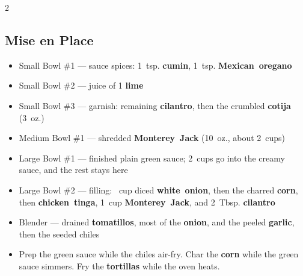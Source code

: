 \documentclass[11pt,letterpaper]{article}
\begin{document}
{\begin{multicols}{2}
\subsection*{Mise en Place}
\begin{itemize}
    \item Small Bowl \#1 --- sauce spices: 1~tsp. \textbf{cumin}, 1~tsp. \textbf{Mexican~oregano}
    \item Small Bowl \#2 --- juice of 1 \textbf{lime}
    \item Small Bowl \#3 --- garnish: remaining \textbf{cilantro}, then the crumbled \textbf{cotija} (3~oz.)
    \item Medium Bowl \#1 --- shredded \textbf{Monterey~Jack} (10~oz., about 2~cups)
    \item Large Bowl \#1 --- finished plain green sauce; 2~cups go into the creamy sauce, and the rest stays here
    \item Large Bowl \#2 --- filling: ~cup diced \textbf{white~onion}, then the charred \textbf{corn}, then \textbf{chicken~tinga}, 1~cup \textbf{Monterey~Jack}, and 2~Tbsp. \textbf{cilantro}
    \item Blender --- drained \textbf{tomatillos}, most of the \textbf{onion}, and the peeled \textbf{garlic}, then the seeded chiles
    \item Prep the green sauce while the chiles air-fry. Char the \textbf{corn} while the green sauce simmers. Fry the \textbf{tortillas} while the oven heats.
\end{itemize}


\end{multicols}}
\end{document}

